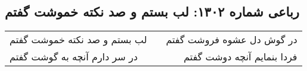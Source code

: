 \begin{center}
\section*{رباعی شماره ۱۳۰۲: لب بستم و صد نکته خموشت گفتم}
\label{sec:1302}
\begin{longtable}{l p{0.5cm} r}
لب بستم و صد نکته خموشت گفتم
&&
در گوش دل عشوه فروشت گفتم
\\
در سر دارم آنچه به گوشت گفتم
&&
فردا بنمایم آنچه دوشت گفتم
\\
\end{longtable}
\end{center}
